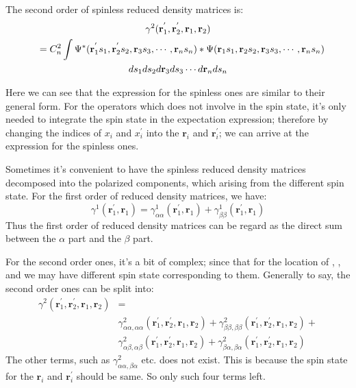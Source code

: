 The second order of spinless reduced density matrices is:
\begin{multline}\label{}
  \gamma^{2}(\mathbf{r}^{'}_{1}, \mathbf{r}^{'}_{2},
  \mathbf{r}_{1}, \mathbf{r}_{2}) \\
  \shoveleft{= C^{2}_{n}\int \Psi^{*}(\mathbf{r}^{'}_{1}s_{1},
    \mathbf{r}^{'}_{2}s_{2}, \mathbf{r}_{3}s_{3}, \cdots,
    \mathbf{r}_{n}s_{n})* \Psi(\mathbf{r}_{1}s_{1},
    \mathbf{r}_{2}s_{2}, \mathbf{r}_{3}s_{3}, \cdots,
    \mathbf{r}_{n}s_{n}) }\\
  ds_{1}ds_{2}d\mathbf{r}_{3}ds_{3}\cdots d\mathbf{r}_{n}ds_{n}
\end{multline}

Here we can see that the expression for the spinless ones are similar
to their general form. For the operators which does not involve in the
spin state, it's only needed to integrate the spin state in the
expectation expression; therefore by changing the indices of $x_{i}$
and $x^{'}_{i}$ into the $\mathbf{r}_{i}$ and $\mathbf{r}^{'}_{i}$; we
can arrive at the expression for the spinless ones.

Sometimes it's convenient to have the spinless reduced density
matrices decomposed into the polarized components, which arising from
the different spin state. For the first order of reduced density
matrices, we have:
\begin{equation}\label{}
  \gamma^{1}(\mathbf{r}^{'}_{1}, \mathbf{r}_{1}) =
  \gamma^{1}_{\alpha\alpha}(\mathbf{r}^{'}_{1}, \mathbf{r}_{1}) +
  \gamma^{1}_{\beta\beta}(\mathbf{r}^{'}_{1}, \mathbf{r}_{1})
\end{equation}
Thus the first order of reduced density matrices can be regard as the
direct sum between the $\alpha$ part and the $\beta$ part.

For the second order ones, it's a bit of complex; since that for the
location of , ,  and
 we may have different spin state corresponding to
them. Generally to say, the second order ones can be split into:
\begin{align}\label{}
  \gamma^{2}(\mathbf{r}^{'}_{1},\mathbf{r}^{'}_{2},
  \mathbf{r}_{1},\mathbf{r}_{2}) &= \nonumber \\
  &\gamma^{2}_{\alpha\alpha,\alpha\alpha}(\mathbf{r}^{'}_{1},\mathbf{r}^{'}_{2},
  \mathbf{r}_{1},\mathbf{r}_{2}) +
  \gamma^{2}_{\beta\beta,\beta\beta}(\mathbf{r}^{'}_{1},\mathbf{r}^{'}_{2},
  \mathbf{r}_{1},\mathbf{r}_{2}) +\nonumber \\
  &\gamma^{2}_{\alpha\beta,\alpha\beta}(\mathbf{r}^{'}_{1},\mathbf{r}^{'}_{2},
  \mathbf{r}_{1},\mathbf{r}_{2}) +
  \gamma^{2}_{\beta\alpha,\beta\alpha}(\mathbf{r}^{'}_{1},\mathbf{r}^{'}_{2},
  \mathbf{r}_{1},\mathbf{r}_{2})
\end{align}
The other terms, such as $\gamma^{2}_{\alpha\alpha,\beta\alpha}$
etc. does not exist. This is because the spin state for the
$\mathbf{r}_{i}$ and $\mathbf{r}^{'}_{i}$ should be same. So only
such four terms left.

